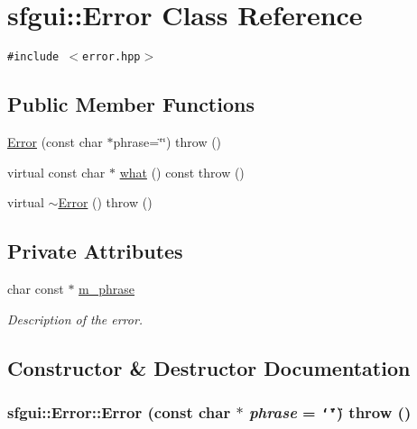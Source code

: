 \hypertarget{classsfgui_1_1Error}{
\section{sfgui::Error Class Reference}
\label{classsfgui_1_1Error}
}
{\tt \#include $<$error.hpp$>$}

\subsection*{Public Member Functions}
\begin{CompactItemize}
\item 
\hyperlink{classsfgui_1_1Error_d402c73e8bfc7b7883700ce2d6c0b7b1}{Error} (const char $\ast$phrase=\char`\"{}\char`\"{})  throw ()
\item 
virtual const char $\ast$ \hyperlink{classsfgui_1_1Error_7e169ba3f26b7585d292bec5a253b8ec}{what} () const   throw ()
\item 
virtual \hyperlink{classsfgui_1_1Error_fb2a732879909cf082f89002c0f03981}{$\sim$Error} ()  throw ()
\end{CompactItemize}
\subsection*{Private Attributes}
\begin{CompactItemize}
\item 
char const $\ast$ \hyperlink{classsfgui_1_1Error_2acba2e2ab334cd94bf392f26f9207ff}{m\_\-phrase}
\begin{CompactList}\small\item\em Description of the error. \item\end{CompactList}\end{CompactItemize}


\subsection{Constructor \& Destructor Documentation}
\hypertarget{classsfgui_1_1Error_d402c73e8bfc7b7883700ce2d6c0b7b1}{
\subsubsection[Error]{\setlength{\rightskip}{0pt plus 5cm}sfgui::Error::Error (const char $\ast$ {\em phrase} = {\tt \char`\"{}\char`\"{}})  throw ()}}
\label{classsfgui_1_1Error_d402c73e8bfc7b7883700ce2d6c0b7b1}


